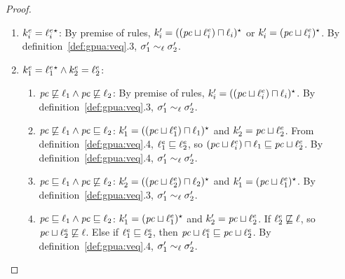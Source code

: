 \begin{proof}
\begin{enumerate}
\begin{enumerate}
       \item $k^{e}_i =   \ell^{e}_i {}^\star  $: By premise of  rules, $k_i'
              =   ((\mathit{pc} \sqcup \ell^e_i) \sqcap \ell_i) {}^\star  $ or $k_i'
              =   (\mathit{pc} \sqcup \ell^e_i) {}^\star  $. By
              definition~\ref{def:gpua:veq}.3, $\sigma_1' \sim_\ell
              \sigma_2'$. 

        \item $k^{e}_1 =   \ell^{e}_1 {}^\star   \wedge
          k^{e}_2 = \ell^e_2$: 
         \begin{enumerate}
            \item $\mathit{pc} \not\sqsubseteq \ell_1 \wedge \mathit{pc}
              \not\sqsubseteq \ell_2$: By premise of  rules, $k_i'
              =   ((\mathit{pc} \sqcup \ell^e_i) \sqcap \ell_i) {}^\star  $. By
              definition~\ref{def:gpua:veq}.3, $\sigma_1' \sim_\ell
              \sigma_2'$.
            \item $\mathit{pc} \not\sqsubseteq \ell_1 \wedge \mathit{pc}
              \sqsubseteq \ell_2$: $k_1' =   ((\mathit{pc} \sqcup \ell^e_1) \sqcap \ell_1) {}^\star
               $ and $k_2' = \mathit{pc} \sqcup \ell^e_2$. From
               definition~\ref{def:gpua:veq}.4, $\ell^e_1 \sqsubseteq \ell^e_2$,
               so $(\mathit{pc} \sqcup \ell^e_i)\sqcap
              \ell_1 \sqsubseteq \mathit{pc} \sqcup \ell^e_2$. By
              definition~\ref{def:gpua:veq}.4, $\sigma_1' \sim_\ell
              \sigma_2'$.
            \item $\mathit{pc} \sqsubseteq \ell_1 \wedge \mathit{pc}
              \not \sqsubseteq \ell_2$: $k_2' =   ((\mathit{pc} \sqcup
              \ell^e_2) \sqcap \ell_2) {}^\star 
               $ and $k_1' =   (\mathit{pc} \sqcup \ell^e_1)
              {}^\star $. By
              definition~\ref{def:gpua:veq}.3, $\sigma_1' \sim_\ell
              \sigma_2'$.
            \item $\mathit{pc} \sqsubseteq \ell_1 \wedge \mathit{pc}
              \sqsubseteq \ell_2$: $k_1' =   (\mathit{pc} \sqcup
              \ell^e_1) {}^\star  $ and $k_2' = \mathit{pc} \sqcup
              \ell^e_2$. If $\ell^e_2 \not\sqsubseteq \ell$, so $\mathit{pc}
              \sqcup \ell^e_2 \not\sqsubseteq \ell$. Else if $\ell^e_1
              \sqsubseteq \ell^e_2$, then $\mathit{pc} \sqcup \ell^e_1
              \sqsubseteq \mathit{pc} \sqcup \ell^e_2$. By
              definition~\ref{def:gpua:veq}.4, $\sigma_1' \sim_\ell
              \sigma_2'$.
          \end{enumerate}


\end{enumerate}
\end{enumerate}
\end{proof}
